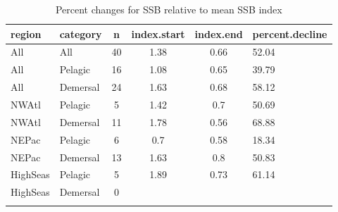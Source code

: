 \begin{longtable}{p{4cm}p{3.5cm}cccp{5.5cm}}
  \hline
region & category & n & index.start & index.end & percent.decline \\ 
  \hline
All & All & 40 & 1.38 & 0.66 & 52.04 \\ 
  All & Pelagic & 16 & 1.08 & 0.65 & 39.79 \\ 
  All & Demersal & 24 & 1.63 & 0.68 & 58.12 \\ 
  NWAtl & Pelagic & 5 & 1.42 & 0.7 & 50.69 \\ 
  NWAtl & Demersal & 11 & 1.78 & 0.56 & 68.88 \\ 
  NEPac & Pelagic & 6 & 0.7 & 0.58 & 18.34 \\ 
  NEPac & Demersal & 13 & 1.63 & 0.8 & 50.83 \\ 
  HighSeas & Pelagic & 5 & 1.89 & 0.73 & 61.14 \\ 
  HighSeas & Demersal & 0 &  &  &  \\ 
   \hline
\hline
\caption{Percent changes for SSB relative to mean SSB index}
\label{tab:orig:perc}
\end{longtable}
